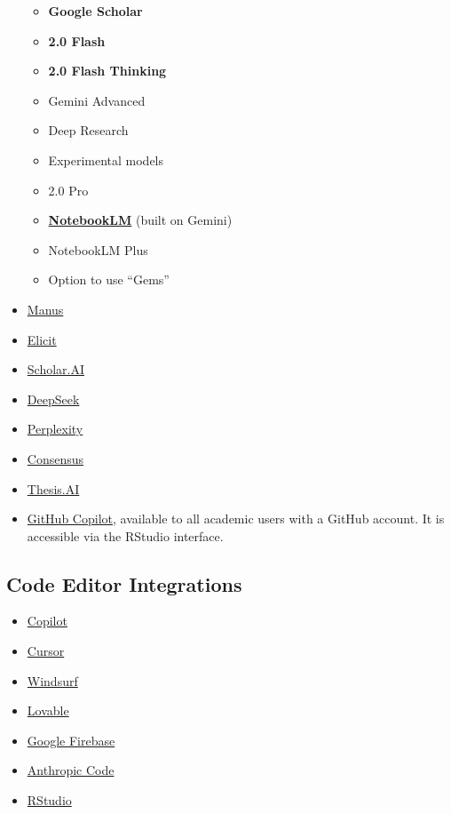 \documentclass[
  10t,
]{article}
\providecommand{\tightlist}{%
  \setlength{\itemsep}{0pt}\setlength{\parskip}{0pt}}
\begin{document}
\begin{itemize}
  \begin{itemize}
  \tightlist
  \item
    \textbf{Google Scholar}
  \item
    \textbf{2.0 Flash}
  \item
    \textbf{2.0 Flash Thinking}
  \item
    Gemini Advanced
  \item
    Deep Research
  \item
    Experimental models
  \item
    2.0 Pro
  \item
    \textbf{\href{https://notebooklm.google.com/}{NotebookLM}} (built on
    Gemini)
  \item
    NotebookLM Plus
  \item
    Option to use ``Gems''
  \end{itemize}
\item
  \href{https://manus.im/}{Manus}
\item
  \href{https://elicit.com}{Elicit}
\item
  \href{https://scholarai.io/}{Scholar.AI}
\item
  \href{https://deepseek.ai/}{DeepSeek}
\item
  \href{https://www.perplexity.ai/}{Perplexity}
\item
  \href{https://consensus.app/}{Consensus}
\item
  \href{https://www.thesisai.io/}{Thesis.AI}
\item
  \href{https://github.com/features/copilot}{GitHub Copilot}, available
  to all academic users with a GitHub account. It is accessible via the
  RStudio interface.
\end{itemize}

\subsection{Code Editor Integrations}\label{code-editor-integrations}

\begin{itemize}
\tightlist
\item
  \href{https://github.com/features/copilot}{Copilot}
\item
  \href{https://www.cursor.com}{Cursor}
\item
  \href{https://windsurf.com}{Windsurf}
\item
  \href{https://lovable.dev}{Lovable}
\item
  \href{https://firebase.google.com}{Google Firebase}
\item
  \href{https://www.anthropic.com/claude-code}{Anthropic Code}
\item
  \href{https://posit.co/products/open-source/rstudio/}{RStudio}
\end{itemize}
\end{document}
